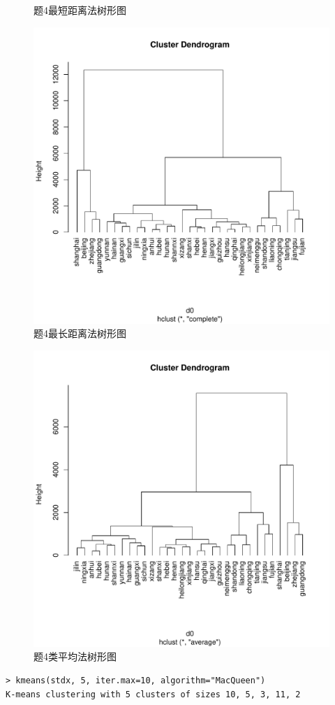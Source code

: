 \begin{enumerate}
\begin{figure}[H]
            \caption{题4最短距离法树形图}
        \end{figure}
        \begin{figure}[H]
            \centering
            \includegraphics[scale=0.5]{7.4最长距离法.pdf}
            \caption{题4最长距离法树形图}
        \end{figure}
        \begin{figure}[H]
            \centering
            \includegraphics[scale=0.5]{7.4类平均法.pdf}
            \caption{题4类平均法树形图}
        \end{figure}
\begin{lstlisting}
> kmeans(stdx, 5, iter.max=10, algorithm="MacQueen")
K-means clustering with 5 clusters of sizes 10, 5, 3, 11, 2


\end{lstlisting}
\end{enumerate}
